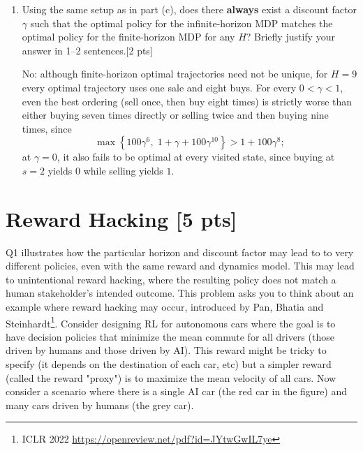 \documentclass[11pt]{article}
\begin{document}
\begin{enumerate}[label=(\alph*)]
\begin{tcolorbox}[breakable]
    \end{tcolorbox}
    \newpage
    \item Using the same setup as in part (c), does there \textbf{always} exist a discount factor $\gamma$ such that the optimal policy for the infinite-horizon MDP matches the optimal policy for the finite-horizon MDP for any $H$? Briefly justify your answer in 1--2 sentences.[2 pts]
    \begin{tcolorbox}[breakable]
No: although finite-horizon optimal trajectories need not be unique,
for $H=9$ every optimal trajectory uses one sale and eight buys.
For every $0<\gamma<1$, even the best ordering (sell once, then buy
eight times) is strictly worse than either buying seven times directly
or selling twice and then buying nine times, since
\[
\max\left\{100\gamma^6,\;1+\gamma+100\gamma^{10}\right\}
>1+100\gamma^8;
\]
at $\gamma=0$, it also fails to be optimal at every visited state,
since buying at $s=2$ yields $0$ while selling yields $1$.
    \end{tcolorbox}
    \newpage

    
\end{enumerate}

\pagebreak

\section{Reward Hacking [5 pts]} 
Q1  illustrates how the particular  horizon and discount factor may lead to 
    to very different policies, even with the same reward and dynamics model. This may lead to unintentional reward hacking, where the resulting policy does not match a human stakeholder's intended outcome. This problem asks you to think about an example where reward hacking may occur, introduced by Pan, Bhatia and Steinhardt\footnote{ICLR 2022 \url{https://openreview.net/pdf?id=JYtwGwIL7ye}}. Consider designing RL for autonomous cars where the goal is to have decision policies that minimize the mean commute for all drivers (those driven by humans and those driven by AI). This reward might be tricky to specify (it depends on the destination of each car, etc) but a simpler reward (called the reward "proxy") is to maximize the mean velocity of all cars. Now consider a scenario where there is a single AI car (the red car in the figure) and many cars driven by humans (the grey car). 
\end{document}
